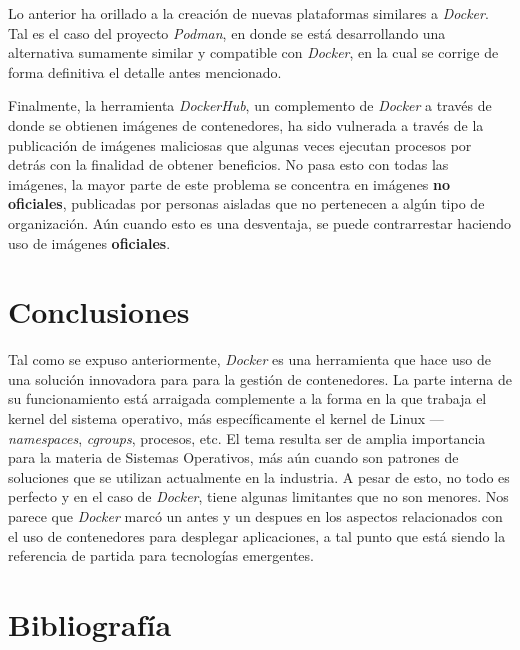 \documentclass[12pt, letterpaper]{article}
\begin{document}
Lo anterior ha orillado a la creación de nuevas plataformas similares a 
\textit{Docker}. Tal es el caso del proyecto \textit{Podman}, en donde se está 
desarrollando una alternativa sumamente similar y compatible con 
\textit{Docker}, en la cual se corrige de forma definitiva el detalle antes 
mencionado.

Finalmente, la herramienta \textit{DockerHub}, un complemento de 
\textit{Docker} a través de donde se obtienen imágenes de contenedores, ha 
sido vulnerada a través de la publicación de imágenes maliciosas que algunas 
veces ejecutan procesos por detrás con la finalidad de obtener beneficios. No 
pasa esto con todas las imágenes, la mayor parte de este problema se concentra 
en imágenes \textbf{no oficiales}, publicadas por personas aisladas que no 
pertenecen a algún tipo de organización. Aún cuando esto es una desventaja, se 
puede contrarrestar haciendo uso de imágenes \textbf{oficiales}.

\section{Conclusiones}
Tal como se expuso anteriormente, \textit{Docker} es una herramienta que hace 
uso de una solución innovadora para para la gestión de contenedores. La parte 
interna de su funcionamiento está arraigada complemente a la forma en la que 
trabaja el kernel del sistema operativo, más específicamente el kernel de 
Linux ---\textit{namespaces}, \textit{cgroups}, procesos, etc. El tema resulta 
ser de amplia importancia para la materia de Sistemas Operativos, más aún 
cuando son patrones de soluciones que se utilizan actualmente en la industria.  
A pesar de esto, no todo es perfecto y en el caso de \textit{Docker}, tiene 
algunas limitantes que no son menores. Nos parece que \textit{Docker} marcó un 
antes y un despues en los aspectos relacionados con el uso de contenedores 
para desplegar aplicaciones, a tal punto que está siendo la referencia de 
partida para tecnologías emergentes.

\clearpage
\nocite{*}
\section{Bibliografía}
\printbibliography[heading=none]
\end{document}
